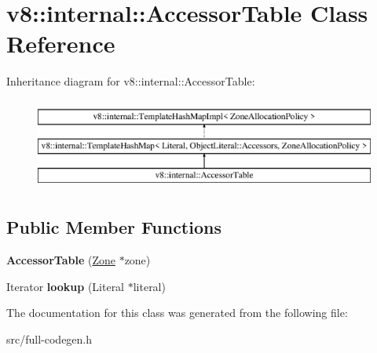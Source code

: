\hypertarget{classv8_1_1internal_1_1_accessor_table}{}\section{v8\+:\+:internal\+:\+:Accessor\+Table Class Reference}
\label{classv8_1_1internal_1_1_accessor_table}
Inheritance diagram for v8\+:\+:internal\+:\+:Accessor\+Table\+:\begin{figure}[H]
\begin{center}
\leavevmode
\includegraphics[height=3.000000cm]{classv8_1_1internal_1_1_accessor_table}
\end{center}
\end{figure}
\subsection*{Public Member Functions}
\begin{DoxyCompactItemize}
\item 
\hypertarget{classv8_1_1internal_1_1_accessor_table_adcee86ad1000d3d63e7360d0895fc2ae}{}{\bfseries Accessor\+Table} (\hyperlink{classv8_1_1internal_1_1_zone}{Zone} $\ast$zone)\label{classv8_1_1internal_1_1_accessor_table_adcee86ad1000d3d63e7360d0895fc2ae}

\item 
\hypertarget{classv8_1_1internal_1_1_accessor_table_a064e2528f1da85829d8742c69adaba19}{}Iterator {\bfseries lookup} (Literal $\ast$literal)\label{classv8_1_1internal_1_1_accessor_table_a064e2528f1da85829d8742c69adaba19}

\end{DoxyCompactItemize}


The documentation for this class was generated from the following file\+:\begin{DoxyCompactItemize}
\item 
src/full-\/codegen.\+h\end{DoxyCompactItemize}
